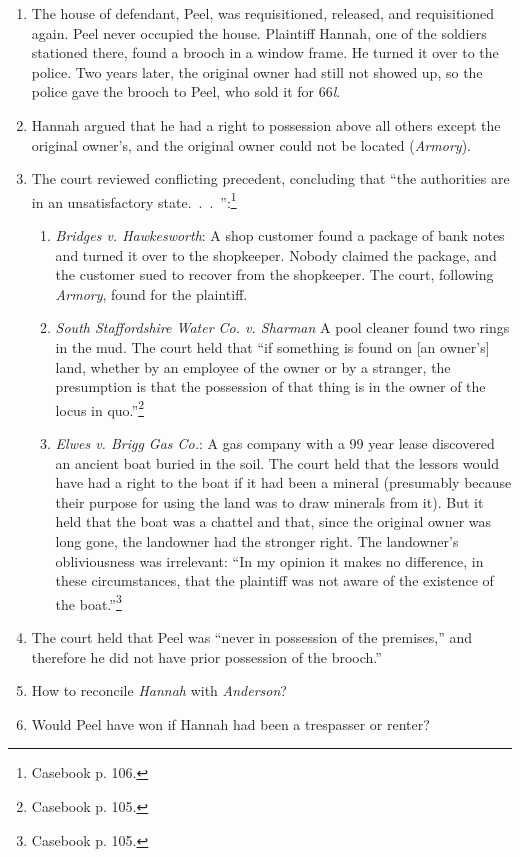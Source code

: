 \begin{enumerate}
    \item The house of defendant, Peel, was requisitioned, released, and 
    requisitioned again. Peel never occupied the house. Plaintiff Hannah, one 
    of the soldiers stationed there, found a brooch in a window frame. He 
    turned it over to the police. Two years later, the original owner had 
    still not showed up, so the police gave the brooch to Peel, who sold it 
    for 66\emph{l}.
    \item Hannah argued that he had a right to possession above all others 
    except the original owner's, and the original owner could not be located 
    (\emph{Armory}).
    \item The court reviewed conflicting precedent, concluding that ``the 
    authorities are in an unsatisfactory state.~.~.~'':\footnote{Casebook p. 
    106.}
    \begin{enumerate}
        \item \emph{Bridges v. Hawkesworth}: A shop customer found a package 
        of bank notes and turned it over to the shopkeeper. Nobody claimed the 
        package, and the customer sued to recover from the shopkeeper. The 
        court, following \emph{Armory}, found for the plaintiff.
        \item \emph{South Staffordshire Water Co. v. Sharman} A pool cleaner 
        found two rings in the mud. The court held that ``if something is 
        found on [an owner's] land, whether by an employee of the owner or by 
        a stranger, the presumption is that the possession of that thing is in 
        the owner of the locus in quo.''\footnote{Casebook p. 105.}
        \item \emph{Elwes v. Brigg Gas Co.}: A gas company with a 99 year 
        lease discovered an ancient boat buried in the soil. The court held 
        that the lessors would have had a right to the boat if it had been a 
        mineral (presumably because their purpose for using the land was to 
        draw minerals from it). But it held that the boat was a chattel and 
        that, since the original owner was long gone, the landowner had the 
        stronger right. The landowner's obliviousness was irrelevant: ``In my 
        opinion it makes no difference, in these circumstances, that the 
        plaintiff was not aware of the existence of the 
        boat.''\footnote{Casebook p. 105.}
    \end{enumerate}
    \item The court held that Peel was ``never in possession of the 
    premises,'' and therefore he did not have prior possession of the 
    brooch.''
    \item How to reconcile \emph{Hannah} with \emph{Anderson}?
    \item Would Peel have won if Hannah had been a trespasser or renter?
\end{enumerate}

